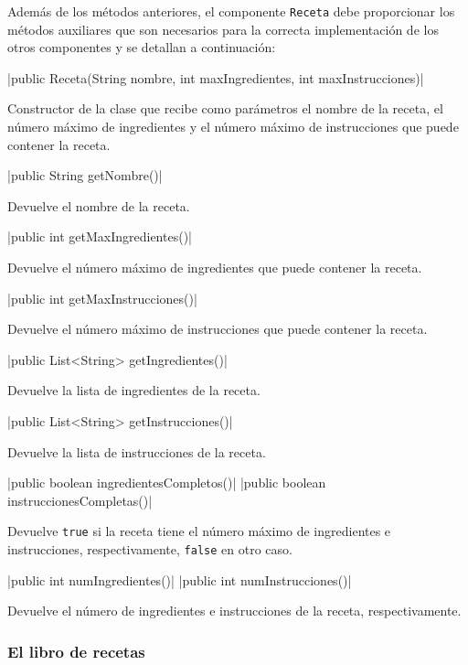 \documentclass[
    a4paper, %
    12pt, %
]{CSSullivanBusinessReport}
\begin{document}
Además de los métodos anteriores, el componente \texttt{Receta} debe proporcionar los métodos auxiliares que son necesarios para la correcta implementación de los otros componentes y se detallan a continuación:

|public Receta(String nombre, int maxIngredientes, int maxInstrucciones)|

Constructor de la clase que recibe como parámetros el nombre de la receta, el número máximo de ingredientes y el número máximo de instrucciones que puede contener la receta.

|public String getNombre()|

Devuelve el nombre de la receta.

|public int getMaxIngredientes()|

Devuelve el número máximo de ingredientes que puede contener la receta.

|public int getMaxInstrucciones()|

Devuelve el número máximo de instrucciones que puede contener la receta.

|public List<String> getIngredientes()|

Devuelve la lista de ingredientes de la receta.

|public List<String> getInstrucciones()|

Devuelve la lista de instrucciones de la receta.

|public boolean ingredientesCompletos()|
|public boolean instruccionesCompletas()|

Devuelve \texttt{true} si la receta tiene el número máximo de ingredientes e instrucciones, respectivamente, \texttt{false} en otro caso.

|public int numIngredientes()|
|public int numInstrucciones()|

Devuelve el número de ingredientes e instrucciones de la receta, respectivamente.



\subsubsection{El libro de recetas}\label{sec:libro-recetas}
\end{document}
